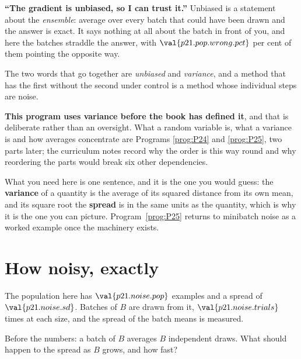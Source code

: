 \begin{fr}
\begin{trapbox}
\textbf{\enquote{The gradient is unbiased, so I can trust it.}} Unbiased is a
statement about the \emph{ensemble}: average over every batch that could have
been drawn and the answer is exact. It says nothing at all about the batch in
front of you, and here the batches straddle the answer, with
$\val{p21.pop.wrong.pct}$ per cent of them pointing the opposite way.

The two words that go together are \emph{unbiased} and \emph{variance}, and a
method that has the first without the second under control is a method whose
individual steps are noise.
\end{trapbox}
\end{fr}

\begin{fr}
\begin{rigourbox}
\textbf{This program uses variance before the book has defined it}, and that
is deliberate rather than an oversight. What a random variable is, what a
variance is and how averages concentrate are Programs \ref{prog:P24} and
\ref{prog:P25}, two parts later; the curriculum notes record why the order is
this way round and why reordering the parts would break six other
dependencies.

What you need here is one sentence, and it is the one you would guess: the
\textbf{variance} of a quantity is the average of its squared distance from
its own mean, and its square root \dash{} the \textbf{spread} \dash{} is in
the same units as the quantity, which is why it is the one you can picture.
Program~\ref{prog:P25} returns to minibatch noise as a worked example once the
machinery exists.
\end{rigourbox}
\end{fr}

\section{How noisy, exactly}
\label{sec:P21-variance}

\begin{fr}
The population here has $\val{p21.noise.pop}$ examples and a spread of
$\val{p21.noise.sd}$. Batches of $B$ are drawn from it,
$\val{p21.noise.trials}$ times at each size, and the spread of the batch means
is measured.

Before the numbers: a batch of $B$ averages $B$ independent draws. What should
happen to the spread as $B$ grows, and how fast?
\dotline
\nextframe
\end{fr}


